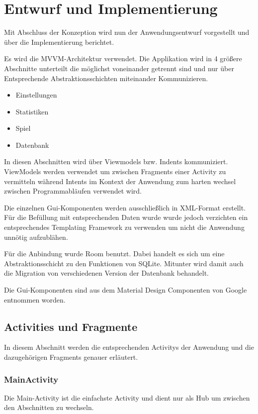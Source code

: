 
\section{Entwurf und Implementierung}
Mit Abschluss der Konzeption wird nun der Anwendungsentwurf vorgestellt und über
die Implementierung berichtet.

Es wird die MVVM-Architektur verwendet. Die Applikation wird in 4 größere
Abschnitte unterteilt die möglichst voneinander getrennt sind und nur über
Entsprechende Abstraktionsschichten miteinander Kommunizieren.
\begin{itemize}[itemsep=0pt]
\item Einstellungen
\item Statistiken
\item Spiel
\item Datenbank
\end{itemize}
In diesen Abschnitten wird über Viewmodels bzw. Indents kommuniziert.
ViewModels werden verwendet um zwischen Fragments einer Activity zu
vermitteln während Intents im Kontext der Anwendung zum harten wechsel zwischen
Programmabläufen verwendet wird.

Die einzelnen Gui-Komponenten werden ausschließlich in XML-Format erstellt. Für
die Befüllung mit entsprechenden Daten wurde wurde jedoch verzichten ein
entsprechendes Templating Framework zu verwenden um nicht die Anwendung unnötig
aufzublähen.

Für die Anbindung wurde Room benutzt. Dabei handelt es sich um eine
Abstraktionsschicht zu den Funktionen von SQLite. Mitunter wird damit auch
die Migration von verschiedenen Version der Datenbank behandelt.

Die Gui-Komponenten sind aus dem Material Design Componenten von Google
entnommen worden.

\subsection{Activities und Fragmente}
In diesem Abschnitt werden die entsprechenden Activitys der Anwendung und
die dazugehörigen Fragments genauer erläutert.

\subsubsection{MainActivity}
Die Main-Activity ist die einfachste Activity und dient nur als Hub um zwischen
den Abschnitten zu wechseln.


